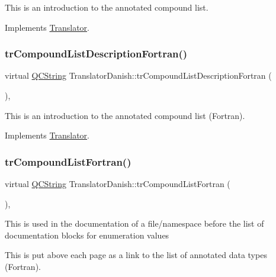 This is an introduction to the annotated compound list. 

Implements \mbox{\hyperlink{class_translator}{Translator}}.

\mbox{\label{class_translator_danish_a3f278f32e828bde2cce5380bbe560f66}} 
\subsubsection{\texorpdfstring{trCompoundListDescriptionFortran()}{trCompoundListDescriptionFortran()}}
{\footnotesize\ttfamily virtual \mbox{\hyperlink{class_q_c_string}{Q\+C\+String}} Translator\+Danish\+::tr\+Compound\+List\+Description\+Fortran (\begin{DoxyParamCaption}{ }\end{DoxyParamCaption})\hspace{0.3cm}{\ttfamily [inline]}, {\ttfamily [virtual]}}

This is an introduction to the annotated compound list (Fortran). 

Implements \mbox{\hyperlink{class_translator}{Translator}}.

\mbox{\label{class_translator_danish_a447b042d5c8092fe9458fbba01eda814}} 
\subsubsection{\texorpdfstring{trCompoundListFortran()}{trCompoundListFortran()}}
{\footnotesize\ttfamily virtual \mbox{\hyperlink{class_q_c_string}{Q\+C\+String}} Translator\+Danish\+::tr\+Compound\+List\+Fortran (\begin{DoxyParamCaption}{ }\end{DoxyParamCaption})\hspace{0.3cm}{\ttfamily [inline]}, {\ttfamily [virtual]}}

This is used in the documentation of a file/namespace before the list of documentation blocks for enumeration values

This is put above each page as a link to the list of annotated data types (Fortran). 

